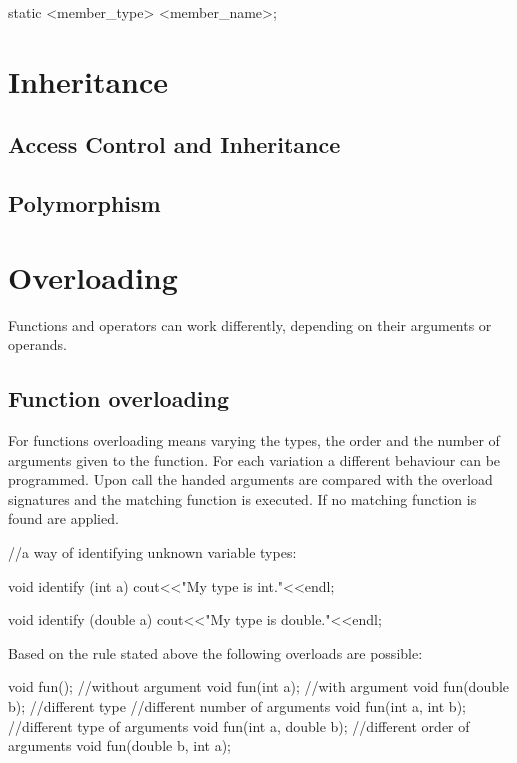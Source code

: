 \documentclass[10pt,a4paper]{scrartcl}
\begin{document}
\begin{multicols*}{2}
\begin{TPCpp}
static <member_type> <member_name>;
\end{TPCpp}

\section{Inheritance}

\subsection{Access Control and Inheritance}

\subsection{Polymorphism}

\section{Overloading}

Functions and operators can work differently, depending on their arguments or operands.

\subsection{Function overloading}

For functions overloading means varying the types, the order and the number of arguments given to the function. For each variation a different behaviour can be programmed. Upon call the handed arguments are compared with the overload signatures and the matching function is executed. If no matching function is found  are applied.

\begin{TPCpp}
//a way of identifying unknown variable types:

void identify (int a){
	cout<<"My type is int."<<endl;
}

void identify (double a){
	cout<<"My type is double."<<endl;
}
\end{TPCpp}

Based on the rule stated above the following overloads are possible:

\begin{TPCpp}
void fun();			//without argument
void fun(int a);	//with argument
void fun(double b); //different type
//different number of arguments
void fun(int a, int b);
//different type of arguments
void fun(int a, double b);
//different order of arguments
void fun(double b, int a);
\end{TPCpp}


\end{multicols*}
\end{document}
